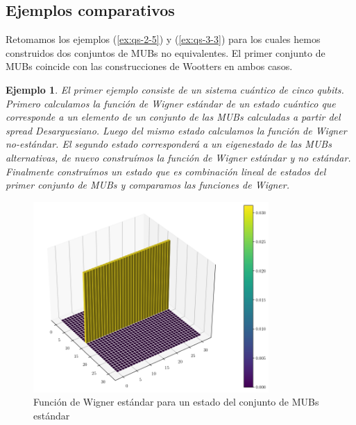 \documentclass[a4paper]{report}
\newtheorem{example}{Ejemplo}
\begin{document}
  \subsection{Ejemplos comparativos} 

  Retomamos los ejemplos (\ref{ex:qs-2-5}) y
  (\ref{ex:qs-3-3}) para los cuales hemos construidos dos
  conjuntos de MUBs no equivalentes. El primer conjunto de
  MUBs coincide con las construcciones de Wootters en ambos
  casos.

  \begin{example}
    El primer ejemplo consiste de un sistema cuántico de
    cinco qubits. Primero calculamos la función de Wigner
    estándar de un estado cuántico que corresponde a un
    elemento de un conjunto de las MUBs calculadas a partir
    del spread Desarguesiano. Luego del mismo estado
    calculamos la función de Wigner no-estándar. El segundo
    estado corresponderá a un eigenestado de las MUBs
    alternativas, de nuevo construímos la función de Wigner
    estándar y no estándar. Finalmente construímos un estado
    que es combinación lineal de estados del primer conjunto
    de MUBs y comparamos las funciones de Wigner.
  \end{example}

  \begin{figure}[ht]
    \centering
    \includegraphics[width=0.8\textwidth]{imgs/wigner-standard-2-5-s1.png}
    \caption{Función de Wigner estándar para un estado del
    conjunto de MUBs estándar}
    \label{fig:wigner-standard-2-5-s1}
  \end{figure}
\end{document}
